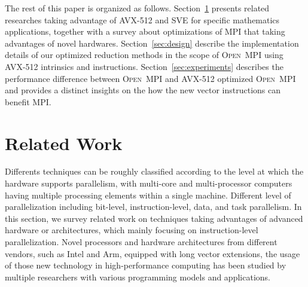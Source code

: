\documentclass[sigconf]{acmart}
\newcommand{\ompi}[0]{\textsc{Open~MPI}\xspace}
\newcommand{\mpi}[0]{\textsc{MPI}\xspace}
\newcommand{\sve}[0]{\textsc{SVE}\xspace}
\begin{document}
The rest of this paper is organized as follows.
Section~\ref{sec:related} presents related researches taking advantage of AVX-512 and \sve for specific mathematics applications, together with a survey about optimizations of \mpi that taking advantages of novel hardwares.
Section~\ref{sec:design} describe the implementation details of our optimized reduction methods in the scope of \ompi using AVX-512 intrinsics and instructions.
Section~\ref{sec:experiments} describes the performance difference between \ompi and AVX-512 optimized \ompi and provides a distinct insights on the how the new vector instructions can benefit \mpi.

\section{Related Work}\label{sec:related}
Differents techniques can be roughly classified according to the level at which
the hardware supports parallelism, with multi-core and multi-processor computers having
multiple processing elements within a single machine. Different level of parallelization including bit-level,
instruction-level, data, and task parallelism.
%
In this section, we survey related work on techniques taking advantages of
advanced hardware or architectures, which mainly focusing on instruction-level parallelization.
Novel processors and hardware architectures from different vendors, such as Intel and Arm,
equipped with long vector extensions, the usage of those new technology in high-performance computing has been
studied by multiple researchers with various programming models and applications.
%
\end{document}

